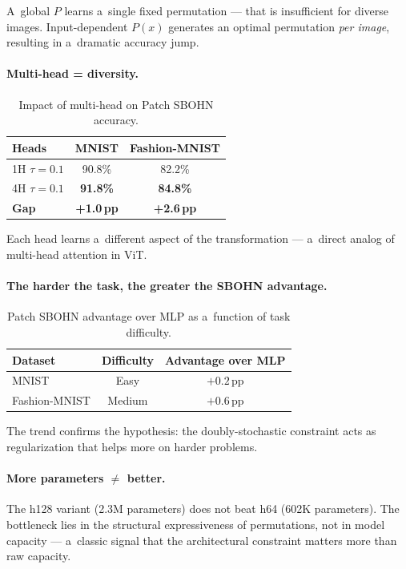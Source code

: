 \documentclass[11pt,a4paper]{report}
\begin{document}
A~global $P$ learns a~single fixed permutation --- that is insufficient for diverse images.
Input-dependent $P(x)$ generates an optimal permutation \emph{per image}, resulting in a~dramatic accuracy jump.

\paragraph{Multi-head = diversity.}

\begin{table}[h]
\centering
\caption{Impact of multi-head on Patch SBOHN accuracy.}
\begin{tabular}{lcc}
\hline
\textbf{Heads} & \textbf{MNIST} & \textbf{Fashion-MNIST} \\
\hline
1H $\tau{=}0.1$ & 90.8\% & 82.2\% \\
4H $\tau{=}0.1$ & \textbf{91.8\%} & \textbf{84.8\%} \\
\textbf{Gap} & \textbf{+1.0\,pp} & \textbf{+2.6\,pp} \\
\hline
\end{tabular}
\end{table}

Each head learns a~different aspect of the transformation --- a~direct analog of multi-head attention in ViT.

\paragraph{The harder the task, the greater the SBOHN advantage.}

\begin{table}[h]
\centering
\caption{Patch SBOHN advantage over MLP as a~function of task difficulty.}
\begin{tabular}{lcc}
\hline
\textbf{Dataset} & \textbf{Difficulty} & \textbf{Advantage over MLP} \\
\hline
MNIST & Easy & $+0.2$\,pp \\
Fashion-MNIST & Medium & $+0.6$\,pp \\
\hline
\end{tabular}
\end{table}

The trend confirms the hypothesis: the doubly-stochastic constraint acts as regularization that helps more on harder problems.

\paragraph{More parameters $\neq$ better.}
The h128 variant (2.3M parameters) does not beat h64 (602K parameters). The bottleneck lies
in the structural expressiveness of permutations, not in model capacity --- a~classic signal
that the architectural constraint matters more than raw capacity.
\end{document}
